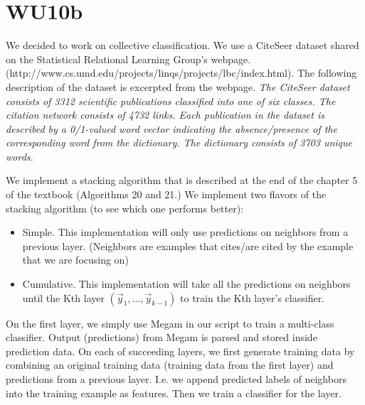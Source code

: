 \newpage
\section{WU10b}
We decided to work on collective classification. We use a CiteSeer dataset shared on the Statistical Relational Learning Group's webpage. (http://www.cs.umd.edu/projects/linqs/projects/lbc/index.html). The following description of the dataset is excerpted from the webpage. \textit{The CiteSeer dataset consists of 3312 scientific publications classified into one of six classes. The citation network consists of 4732 links. Each publication in the dataset is described by a 0/1-valued word vector indicating the absence/presence of the corresponding word from the dictionary. The dictionary consists of 3703 unique words.}

We implement a stacking algorithm that is described at the end of the chapter 5 of the textbook (Algorithms 20 and 21.) We implement two flavors of the stacking algorithm (to see which one performs better):

\begin{itemize}
	\item Simple. This implementation will only use predictions on neighbors from a previous layer. (Neighbors are examples that cites/are cited by the example that we are focusing on)
	\item Cumulative. This implementation will take all the predictions on neighbors until the Kth layer $(\vec y_1, ..., \vec y_{k-1})$ to train the Kth layer's classifier.
\end{itemize}

On the first layer, we simply use Megam in our script to train a multi-class classifier. Output (predictions) from Megam is parsed and stored inside prediction data. On each of succeeding layers, we first generate training data by combining an original training data (training data from the first layer) and predictions from a previous layer. I.e. we append predicted labels of neighbors into the training example as features. Then we train a classifier for the layer.

